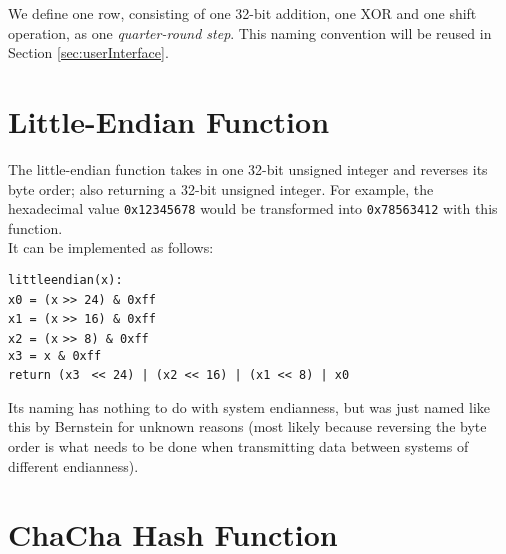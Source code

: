 \begin{remark}
We define one row, consisting of one 32-bit addition, one XOR and one shift operation, as one \textit{quarter-round step}. This naming convention will be reused in Section \ref{sec:userInterface}.
\end{remark}

\section{Little-Endian Function}
\label{sec:chacha.littleendian}

The little-endian function takes in one 32-bit unsigned integer and reverses its byte order; also returning a 32-bit unsigned integer.  For example, the hexadecimal value \texttt{0x12345678} would be transformed into \texttt{0x78563412} with this function.\\
It can be implemented as follows:

\begin{center}
\begin{minipage}{0.8\linewidth}
\texttt{littleendian(x):} \\
\hspace*{2em}\texttt{x0 = (x} \verb|>>|\texttt{ 24) \& 0xff} \\
\hspace*{2em}\texttt{x1 = (x} \verb|>>|\texttt{ 16) \& 0xff} \\
\hspace*{2em}\texttt{x2 = (x} \verb|>>|\texttt{ 8) \& 0xff} \\
\hspace*{2em}\texttt{x3 = x \& 0xff} \\
\hspace*{2em}\texttt{return (x3 } \verb|<<|\texttt{ 24) | (x2 }\verb|<<|\texttt{ 16) | (x1 }\verb|<<|\texttt{ 8) | x0}
\end{minipage}
\end{center}

\begin{remark}
Its naming has nothing to do with system endianness, but was just named like this by Bernstein for unknown reasons (most likely because reversing the byte order is what needs to be done when transmitting data between systems of different endianness).
\end{remark}

\section{ChaCha Hash Function}
\label{sec:chacha.hash}

